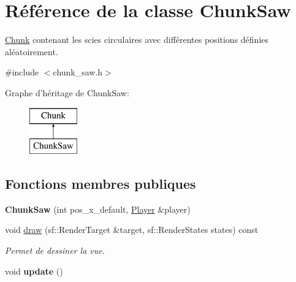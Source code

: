 \hypertarget{class_chunk_saw}{\section{Référence de la classe Chunk\+Saw}
\label{class_chunk_saw}
}


\hyperlink{class_chunk}{Chunk} contenant les scies circulaires avec différentes positions définies aléatoirement.  




{\ttfamily \#include $<$chunk\+\_\+saw.\+h$>$}

Graphe d'héritage de Chunk\+Saw\+:\begin{figure}[H]
\begin{center}
\leavevmode
\includegraphics[height=2.000000cm]{class_chunk_saw}
\end{center}
\end{figure}
\subsection*{Fonctions membres publiques}
\begin{DoxyCompactItemize}
\item 
\hypertarget{class_chunk_saw_a4d936b36b04a7ef91a8b691db4aceef1}{{\bfseries Chunk\+Saw} (int pos\+\_\+x\+\_\+default, \hyperlink{class_player}{Player} \&player)}\label{class_chunk_saw_a4d936b36b04a7ef91a8b691db4aceef1}

\item 
\hypertarget{class_chunk_saw_a11f22e826f56038e836fcd964f94b40a}{void \hyperlink{class_chunk_saw_a11f22e826f56038e836fcd964f94b40a}{draw} (sf\+::\+Render\+Target \&target, sf\+::\+Render\+States states) const }\label{class_chunk_saw_a11f22e826f56038e836fcd964f94b40a}

\begin{DoxyCompactList}\small\item\em Permet de dessiner la vue. \end{DoxyCompactList}\item 
\hypertarget{class_chunk_saw_a558a003eeedc4d35a83c3c157e3d5009}{void {\bfseries update} ()}\label{class_chunk_saw_a558a003eeedc4d35a83c3c157e3d5009}

\end{DoxyCompactItemize}
